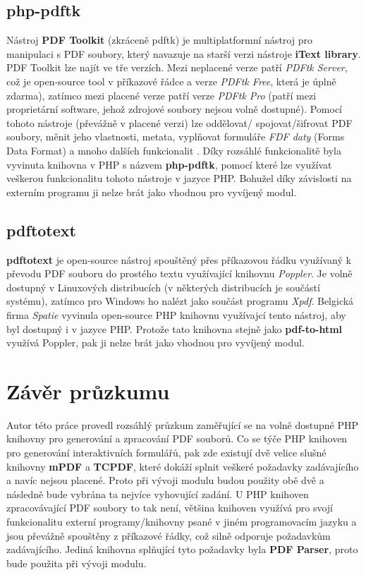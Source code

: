 \subsection{php-pdftk}
Nástroj \textbf{PDF Toolkit} (zkráceně pdftk) je multiplatformní nástroj pro manipulaci s PDF soubory, který navazuje na starší verzi nástroje \textbf{iText library}. PDF Toolkit lze najít ve tře verzích. Mezi neplacené verze patří \textit{PDFtk Server}, což je open-source tool v příkazové řádce a verze \textit{PDFtk Free}, která je úplně zdarma), zatímco mezi placené verze patří verze \textit{PDFtk Pro} (patří mezi proprietární software, jehož zdrojové soubory nejsou volně dostupné). Pomocí tohoto nástroje (převážně v placené verzi) lze oddělovat/ spojovat/šifrovat PDF soubory, měnit jeho vlastnosti, metata, vyplňovat formuláře \textit{FDF daty} (Forms Data Format) a mnoho dalších funkcionalit \cite{phppdftk}. Díky rozsáhlé funkcionalitě byla vyvinuta knihovna v PHP s názvem \textbf{php-pdftk}, pomocí které lze využívat veškerou funkcionalitu tohoto nástroje v jazyce PHP. Bohužel díky závislosti na externím programu ji nelze brát jako vhodnou pro vyvíjený modul.
\subsection{pdftotext}
\textbf{pdftotext} je open-source nástroj spouštěný přes příkazovou řádku využívaný k převodu PDF souboru do prostého textu využívající knihovnu \textit{Poppler}. Je volně dostupný v Linuxových distribucích (v některých distribucích je součástí systému), zatímco pro Windows ho nalézt jako součást programu \textit{Xpdf}. Belgická firma \textit{Spatie} vyvinula open-source PHP knihovnu využívajcí tento nástroj, aby byl dostupný i v jazyce PHP. Protože tato knihovna stejně jako \textbf{pdf-to-html} využívá Poppler, pak ji nelze brát jako vhodnou pro vyvíjený modul.
\section{Závěr průzkumu}
Autor této práce provedl rozsáhlý průzkum zaměřující se na volně dostupné PHP knihovny pro generování a zpracování PDF souborů. Co se týče PHP knihoven pro generování interaktivních formulářů, pak zde existují  dvě velice slušné knihovny \textbf{mPDF} a \textbf{TCPDF}, které dokáží  splnit veškeré požadavky zadávajícího a navíc nejsou placené. Proto při vývoji modulu budou použity obě dvě a následně bude vybrána ta nejvíce vyhovující zadání. U PHP knihoven zpracovávající PDF soubory to tak není, většina knihoven využívá pro svojí funkcionalitu externí programy/knihovny psané v jiném programovacím jazyku a jsou převážně spouštěny z příkazové řádky, což silně odporuje požadavkům zadávajícího. Jediná knihovna splňující tyto požadavky byla \textbf{PDF Parser}, proto bude použita při vývoji modulu. 